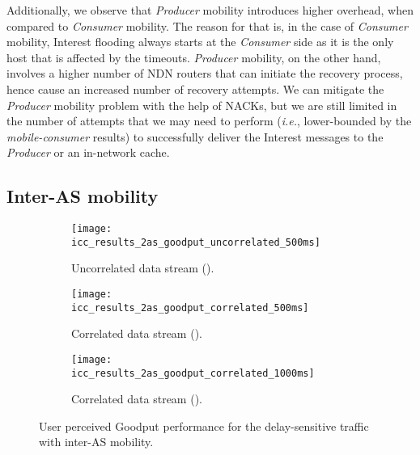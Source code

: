 \documentclass[conference]{IEEEtran}
\begin{document}
Additionally, we observe that \emph{Producer} mobility introduces higher overhead, when compared to \emph{Consumer} mobility. The reason for that is, in the case of \emph{Consumer} mobility, Interest flooding always starts at the \emph{Consumer} side as it is the only host that is affected by the timeouts. \emph{Producer} mobility, on the other hand, involves a higher number of NDN routers that can initiate the recovery process, hence cause an increased number of recovery attempts. We can mitigate the \emph{Producer} mobility problem with the help of NACKs, but we are still limited in the number of attempts that we may need to perform (\emph{i.e.}, lower-bounded by the \emph{mobile-consumer} results) to successfully deliver the Interest messages to the \emph{Producer} or an in-network cache.



\subsection{Inter-AS mobility}
\begin{figure*}
        \centering
        \hspace{-0.15in}
        \begin{subfigure}[b]{0.3\textwidth}\centering
               \texttt{[image: icc\_results\_2as\_goodput\_uncorrelated\_500ms]}\\
               \caption{Uncorrelated data stream ().}
               \label{2ASUncorrelatedGoodput}
        \end{subfigure}
        \hspace{0.05in}
        \begin{subfigure}[b]{0.3\textwidth}\centering
                \texttt{[image: icc\_results\_2as\_goodput\_correlated\_500ms]}\\
                \caption{Correlated data stream ().}
                \label{2ASCorrelatedGoodput250ms}
        \end{subfigure}
        \hspace{0.05in}
        \begin{subfigure}[b]{0.3\textwidth}\centering
                \texttt{[image: icc\_results\_2as\_goodput\_correlated\_1000ms]}\\
                \caption{Correlated data stream ().}
                \label{2ASCorrelatedGoodput1000ms}
        \end{subfigure}
        \caption{User perceived Goodput performance for the delay-sensitive traffic with inter-AS mobility.}\label{fig:delay_sensitive_goodput_2as}
\end{figure*}
\end{document}
